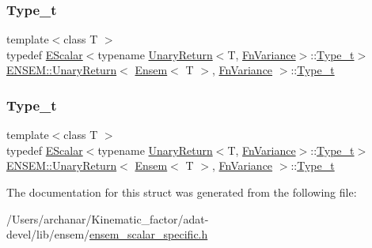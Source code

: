 \subsubsection{\texorpdfstring{Type\_t}{Type\_t}\hspace{0.1cm}{\footnotesize\ttfamily [2/3]}}
{\footnotesize\ttfamily template$<$class T $>$ \\
typedef \mbox{\hyperlink{classENSEM_1_1EScalar}{E\+Scalar}}$<$typename \mbox{\hyperlink{structENSEM_1_1UnaryReturn}{Unary\+Return}}$<$T, \mbox{\hyperlink{structENSEM_1_1FnVariance}{Fn\+Variance}}$>$\+::\mbox{\hyperlink{structENSEM_1_1UnaryReturn_3_01Ensem_3_01T_01_4_00_01FnVariance_01_4_ab460044d5646089e41eebeb2f5be9f33}{Type\+\_\+t}}$>$ \mbox{\hyperlink{structENSEM_1_1UnaryReturn}{E\+N\+S\+E\+M\+::\+Unary\+Return}}$<$ \mbox{\hyperlink{classENSEM_1_1Ensem}{Ensem}}$<$ T $>$, \mbox{\hyperlink{structENSEM_1_1FnVariance}{Fn\+Variance}} $>$\+::\mbox{\hyperlink{structENSEM_1_1UnaryReturn_3_01Ensem_3_01T_01_4_00_01FnVariance_01_4_ab460044d5646089e41eebeb2f5be9f33}{Type\+\_\+t}}}

\mbox{\label{structENSEM_1_1UnaryReturn_3_01Ensem_3_01T_01_4_00_01FnVariance_01_4_ab460044d5646089e41eebeb2f5be9f33}} 
\subsubsection{\texorpdfstring{Type\_t}{Type\_t}\hspace{0.1cm}{\footnotesize\ttfamily [3/3]}}
{\footnotesize\ttfamily template$<$class T $>$ \\
typedef \mbox{\hyperlink{classENSEM_1_1EScalar}{E\+Scalar}}$<$typename \mbox{\hyperlink{structENSEM_1_1UnaryReturn}{Unary\+Return}}$<$T, \mbox{\hyperlink{structENSEM_1_1FnVariance}{Fn\+Variance}}$>$\+::\mbox{\hyperlink{structENSEM_1_1UnaryReturn_3_01Ensem_3_01T_01_4_00_01FnVariance_01_4_ab460044d5646089e41eebeb2f5be9f33}{Type\+\_\+t}}$>$ \mbox{\hyperlink{structENSEM_1_1UnaryReturn}{E\+N\+S\+E\+M\+::\+Unary\+Return}}$<$ \mbox{\hyperlink{classENSEM_1_1Ensem}{Ensem}}$<$ T $>$, \mbox{\hyperlink{structENSEM_1_1FnVariance}{Fn\+Variance}} $>$\+::\mbox{\hyperlink{structENSEM_1_1UnaryReturn_3_01Ensem_3_01T_01_4_00_01FnVariance_01_4_ab460044d5646089e41eebeb2f5be9f33}{Type\+\_\+t}}}



The documentation for this struct was generated from the following file\+:\begin{DoxyCompactItemize}
\item 
/\+Users/archanar/\+Kinematic\+\_\+factor/adat-\/devel/lib/ensem/\mbox{\hyperlink{adat-devel_2lib_2ensem_2ensem__scalar__specific_8h}{ensem\+\_\+scalar\+\_\+specific.\+h}}\end{DoxyCompactItemize}
